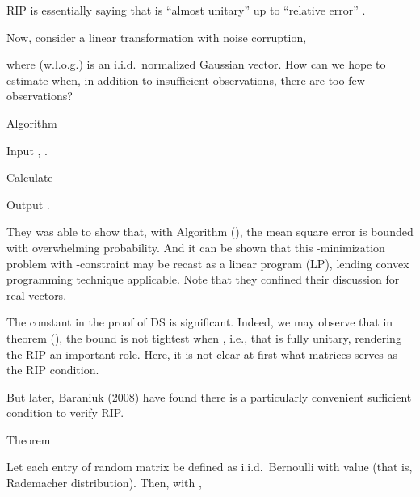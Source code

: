 RIP is essentially saying that  is ``almost unitary'' up to ``relative error'' .

Now, consider a linear transformation with noise corruption,


where (w.l.o.g.)  is an i.i.d.\ normalized Gaussian vector.
How can we hope to estimate  when, in addition to insufficient observations, there are too few observations?

\Result
{Algorithm}
{
\startitemize[n]
\item Input , .
\item Calculate
\item Output .
}

They was able to show that, with Algorithm (), the mean square error is bounded with overwhelming probability.
And it can be shown that this -minimization problem with \m {\ell_\infty}-constraint may be recast as a linear program (LP), lending convex programming technique applicable.
Note that they confined their discussion for real vectors.

\stopsection
\startsection [title={Sufficient Conditions of RIP}]

The constant \m {\d} in the proof of DS is significant.
Indeed, we may observe that in theorem (), the bound is not tightest when , i.e., that  is fully unitary, rendering the RIP an important role.
Here, it is not clear at first what matrices serves as the RIP condition.

But later, Baraniuk (2008) have found there is a particularly convenient sufficient condition to verify RIP.

\Result
{Theorem}
{
Let each entry of random matrix  be defined as i.i.d.\ Bernoulli with value  (that is, Rademacher distribution).
Then, with ,

}

\color[red] {(To be done)}

